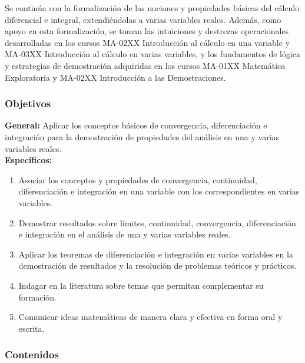 \begin{refsection}
Se continúa con la formalización de las nociones y propiedades básicas del cálculo diferencial e integral, extendiéndolas a varias variables reales. Además, como apoyo en esta formalización, se toman las intuiciones y destrezas operacionales desarrolladas en los cursos MA-02XX Introducción al cálculo en una variable y MA-03XX Introducción al cálculo en varias variables, y los fundamentos de lógica y estrategias de demostración adquiridas en los cursos MA-01XX Matemática Exploratoria y MA-02XX Introducción a las Demostraciones.





\subsubsection*{Objetivos}

\textbf{General:} Aplicar los conceptos básicos de convergencia, diferenciación e integración para la demostración de propiedades del análisis en una y varias variables reales. \\

\textbf{Específicos:}

\begin{enumerate}
\item Asociar los conceptos y propiedades de convergencia, continuidad, diferenciación e integración en una variable con los correspondientes en varias variables.
\item Demostrar resultados sobre límites, continuidad, convergencia, diferenciación e integración en el análisis de una y varias variables reales.
\item Aplicar los teoremas de diferenciación e integración en varias variables en la demostración de resultados y la resolución de problemas teóricos y prácticos.
\item Indagar en la literatura sobre temas que permitan complementar su formación.
\item Comunicar ideas matemáticas de manera clara y efectiva en forma oral y escrita.
\end{enumerate}

\subsubsection*{Contenidos}


\end{refsection}
